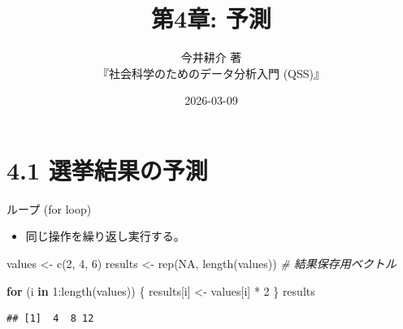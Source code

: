 \documentclass[
  ignorenonframetext,
]{beamer}
\title{第4章: 予測}
\subtitle{今井耕介 著\\
『社会科学のためのデータ分析入門 (QSS)』}
\author{}
\date{\vspace{-2.5em}2026-03-09}
\newenvironment{Shaded}{\begin{snugshade}}{\end{snugshade}}
\newcommand{\CommentTok}[1]{\textcolor[rgb]{0.56,0.35,0.01}{\textit{#1}}}
\newcommand{\ConstantTok}[1]{\textcolor[rgb]{0.00,0.00,0.00}{#1}}
\newcommand{\ControlFlowTok}[1]{\textcolor[rgb]{0.13,0.29,0.53}{\textbf{#1}}}
\newcommand{\DecValTok}[1]{\textcolor[rgb]{0.00,0.00,0.81}{#1}}
\newcommand{\FunctionTok}[1]{\textcolor[rgb]{0.00,0.00,0.00}{#1}}
\newcommand{\NormalTok}[1]{#1}
\newcommand{\OtherTok}[1]{\textcolor[rgb]{0.56,0.35,0.01}{#1}}
\newcommand{\SpecialCharTok}[1]{\textcolor[rgb]{0.00,0.00,0.00}{#1}}
\providecommand{\tightlist}{%
  \setlength{\itemsep}{0pt}\setlength{\parskip}{0pt}}
\begin{document}
\frame{\titlepage}

\hypertarget{ux9078ux6319ux7d50ux679cux306eux4e88ux6e2c}{%
\section{4.1
選挙結果の予測}\label{ux9078ux6319ux7d50ux679cux306eux4e88ux6e2c}}

\begin{frame}[fragile]{ループ (for loop)}
\protect\hypertarget{ux30ebux30fcux30d7-for-loop}{}
\begin{itemize}
\tightlist
\item
  同じ操作を繰り返し実行する。
\end{itemize}

\scriptsize

\begin{Shaded}
\begin{Highlighting}[]
\NormalTok{values }\OtherTok{\textless{}{-}} \FunctionTok{c}\NormalTok{(}\DecValTok{2}\NormalTok{, }\DecValTok{4}\NormalTok{, }\DecValTok{6}\NormalTok{)}
\NormalTok{results }\OtherTok{\textless{}{-}} \FunctionTok{rep}\NormalTok{(}\ConstantTok{NA}\NormalTok{, }\FunctionTok{length}\NormalTok{(values)) }\CommentTok{\# 結果保存用ベクトル}

\ControlFlowTok{for}\NormalTok{ (i }\ControlFlowTok{in} \DecValTok{1}\SpecialCharTok{:}\FunctionTok{length}\NormalTok{(values)) \{}
\NormalTok{    results[i] }\OtherTok{\textless{}{-}}\NormalTok{ values[i] }\SpecialCharTok{*} \DecValTok{2}
\NormalTok{\}}
\NormalTok{results}
\end{Highlighting}
\end{Shaded}

\begin{verbatim}
## [1]  4  8 12
\end{verbatim}

\normalsize
\end{frame}
\end{document}
